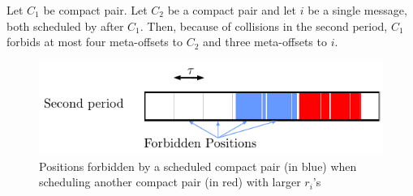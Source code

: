 \documentclass[pdflatex,sn-mathphys,iicol]{sn-jnl}%
\theoremstyle{thmstyleone}%
\theoremstyle{thmstyletwo}%
\theoremstyle{thmstylethree}%
\begin{document}
\begin{lemma}\label{lemma:pair_forbid}
Let $C_1$ be compact pair. Let $C_2$ be a compact pair and let $i$ be a single message, both scheduled by \compactpair after $C_1$.
Then, because of collisions in the second period, $C_1$ forbids at most four meta-offsets to $C_2$ and three meta-offsets to $i$. 
\end{lemma}

\begin{figure}
\begin{center}
\includegraphics[scale=0.7]{pairforbiden}
\end{center}

\caption{Positions forbidden by a scheduled compact pair (in blue) when scheduling another compact pair (in red) with larger $r_i$'s} 
\label{fig:forbidenmeta}
\end{figure}
\end{document}
